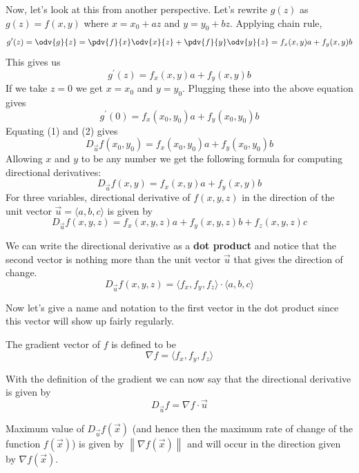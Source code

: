Now, let's look at this from another perspective. Let's rewrite $g(z)$ as $g(z) = f(x,y)$ where $x=x_0+az$ and $y=y_0+bz$. Applying chain rule,
\[ g^\prime(z) = \odv{g}{z} = \pdv{f}{x}\odv{x}{z} + \pdv{f}{y}\odv{y}{z} = f_x (x,y)a + f_y (x,y)b \]
This gives us
\[ g^\prime(z) = f_x (x,y)a + f_y (x,y)b \]
If we take $z=0$ we get $x=x_0$ and $y=y_0$. Plugging these into the above equation gives
\begin{equation}\tag{2}
g^\prime(0) = f_x (x_0,y_0)a + f_y (x_0,y_0)b
\end{equation}
Equating (1) and (2) gives
\[ {D_{\vec u}}f(x_0,y_0) = f_x(x_0,y_0)a + f_y(x_0,y_0)b \]
Allowing $x$ and $y$ to be any number we get the following formula for computing directional derivatives:
\[ {D_{\vec u}}f(x,y) = f_x(x,y)a + f_y(x,y)b \]
For three variables, directional derivative of $f(x,y,z)$ in the direction of the unit vector $\vec{u}=\langle{a,b,c}\rangle$ is given by
\begin{equation}
{D_{\vec u}}f(x,y,z) = f_x (x,y,z)a + f_y (x,y,z)b + f_z (x,y,z)c
\end{equation}

We can write the directional derivative as a \textbf{dot product} and notice that the second vector is nothing more than the unit vector $\vec u$ that gives the direction of change.
\begin{equation}
{D_{\vec u}} f(x,y,z) = \langle {f_x,f_y,f_z} \rangle \cdot \langle {a,b,c} \rangle
\end{equation}

Now let's give a name and notation to the first vector in the dot product since this vector will show up fairly regularly.
\begin{definition}
The gradient vector of $f$ is defined to be
\begin{equation}
\nabla f = \langle f_x,f_y,f_z \rangle
\end{equation}
\end{definition}

With the definition of the gradient we can now say that the directional derivative is given by
\[ {D_{\vec u}}f = \nabla f\cdot \vec u \]

\begin{theorem}
Maximum value of $D_{\vec u} f(\vec{x})$ (and hence then the maximum rate of change of the function $f(\vec{x})$) is given by $\left\|\nabla f(\vec{x})\right\|$ and will occur in the direction given by $\nabla f(\vec{x})$.
\end{theorem}

